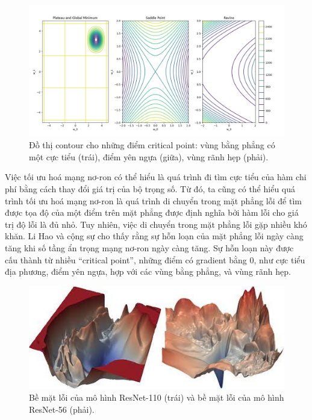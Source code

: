\begin{figure}[htp]
\centering
\includegraphics[width=120 mm]{images/cricial-point-contour.png}
\caption{Đồ thị contour cho những điểm critical point: vùng bằng phẳng có một cực tiểu (trái), điểm yên ngựa (giữa), vùng rãnh hẹp (phải).}
\label{fig:cricial-point-contour}
\end{figure}

Việc tối ưu hoá mạng nơ-ron có thể hiểu là quá trình đi tìm cực tiểu của hàm chi phí bằng cách thay đổi giá trị của bộ trọng số. Từ đó, ta cũng có thể hiểu quá trình tối ưu hoá mạng nơ-ron là quá trình di chuyển trong mặt phẳng lỗi để tìm được tọa độ của một điểm trên mặt phẳng được định nghĩa bởi hàm lỗi cho giá trị độ lỗi là đủ nhỏ. Tuy nhiên, việc di chuyển trong mặt phẳng lỗi gặp nhiều khó khăn. Li Hao và cộng sự \cite{li2018visualizing} cho thấy rằng sự hỗn loạn của mặt phẳng lỗi ngày càng tăng khi số tầng ẩn trọng mạng nơ-ron ngày càng tăng. Sự hỗn loạn này được cấu thành từ nhiều ``critical point'', những điểm có gradient bằng 0, như cực tiểu địa phương, điểm yên ngựa, hợp với các vùng bằng phẳng, và vùng rãnh hẹp.

\begin{figure}[htp]
\centering
\includegraphics[width=120 mm]{images/resnet-loss.png}
\caption{Bề mặt lỗi của mô hình ResNet-110 (trái) và bề mặt lỗi của mô hình ResNet-56 (phải). \cite{li2018visualizing}}
\label{fig:resnet-loss}
\end{figure}


